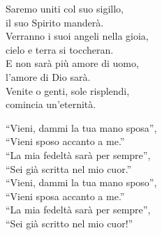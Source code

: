 
 

\spazio

\strofa Saremo uniti col suo sigillo,\\
il suo Spirito manderà.\\
Verranno i suoi angeli nella gioia,\\
cielo e terra si toccheran.\\
E non sarà più amore di uomo,\\
l’amore di Dio sarà.\\
Venite o genti, sole risplendi,\\
comincia un'eternità.

\spazio


\spazio

\strofa ``Vieni, dammi la tua mano sposa'',\\
``Vieni sposo accanto a me.''\\
``La mia fedeltà sarà per sempre'',\\
``Sei già scritta nel mio cuor.''\\
``Vieni, dammi la tua mano sposo'',\\
``Vieni sposa accanto a me.''\\
``La mia fedeltà sarà per sempre'',\\
``Sei già scritto nel mio cuor!''

\spazio


